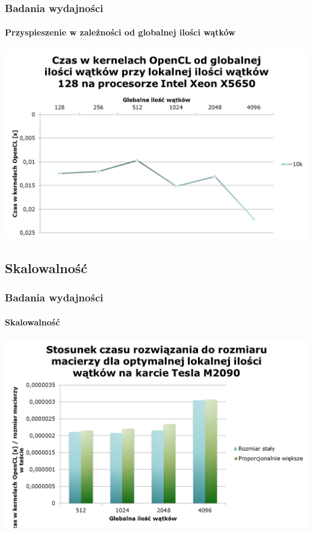 \documentclass[12pt,handout]{beamer}
\begin{document}
\begin{frame}
\frametitle{Badania wydajności}
\framesubtitle{Przyspieszenie w zależności od globalnej ilości wątków}
\hfill\includegraphics[scale=0.45]{czas4.png}\hspace*{\fill}
\end{frame}

\subsection{Skalowalność}

\begin{frame}
\frametitle{Badania wydajności}
\framesubtitle{Skalowalność}
\hfill\includegraphics[scale=0.45]{czas5.png}\hspace*{\fill}
\end{frame}
\end{document}
